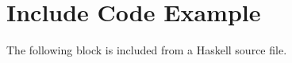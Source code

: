 \section{Include Code Example}\label{include-code-example}

The following block is included from a Haskell source file.

\begin{Shaded}
\begin{Highlighting}[]
 
  \OtherTok{=} 
  \OperatorTok{|} 
  \OperatorTok{|} 
\end{Highlighting}
\end{Shaded}
